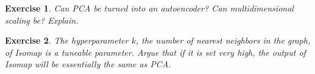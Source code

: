 \documentclass{article}
\newtheorem{exercise}{Exercise}
\begin{document}
\begin{exercise}
    Can PCA be turned into an autoencoder? Can multidimensional scaling be? Explain.
\end{exercise}

\begin{exercise}
    The hyperparameter $k$, the number of nearest neighbors in the graph, of Isomap is a tuneable parameter. Argue that if it is set very high, the output of Isomap will be essentially the same as PCA.
\end{exercise}



\end{document}
